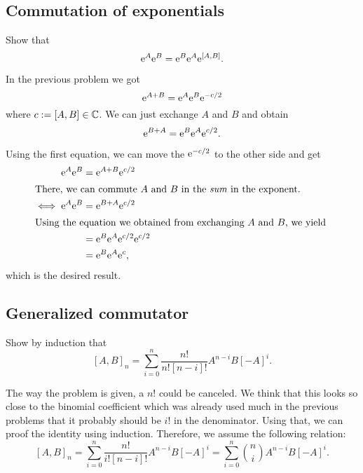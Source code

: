 \documentclass[11pt, english, fleqn, DIV=15, headinclude, BCOR=1.5cm]{scrartcl}
\begin{document}
\subsection{Commutation of exponentials}

\begin{problem}
    Show that
    \[
        \mathrm e^A \mathrm e^B = \mathrm e^B \mathrm e^A \mathrm e^{[A,B]}.
    \]
\end{problem}

In the previous problem we got
\[
    \mathrm e^{A + B} = \mathrm e^A \mathrm e^B \mathrm e^{-c/2}
\]
where $c := [A, B] \in \mathbb C$. We can just exchange $A$ and $B$ and obtain
\[
    \mathrm e^{B + A} = \mathrm e^B \mathrm e^A \mathrm e^{c/2}.
\]

Using the first equation, we can move the $\mathrm e^{-c/2}$ to the other side and
get
\begin{align*}
    \eup^A \eup^B &= \eup^{A + B} \eup^{c/2} \\
    \intertext{%
        There, we can commute $A$ and $B$ in the \emph{sum} in the exponent.
    }
    \iff \eup^A \eup^B &= \eup^{B + A} \eup^{c/2} \\
    \intertext{%
        Using the equation we obtained from exchanging $A$ and $B$, we yield
    }
    &= \eup^B \eup^A \eup^{c/2} \eup^{c/2} \\
    &= \eup^B \eup^A \eup^{c},
\end{align*}
which is the desired result.

\subsection{Generalized commutator}

\begin{problem}
    Show by induction that
    \[
        [A, B]_n = \sum_{i=0}^n \frac{n!}{n![n-i]!} A^{n-i} B [-A]^i.
    \]
\end{problem}

The way the problem is given, a $n!$ could be canceled. We think that this
looks so close to the binomial coefficient which was already used much in the
previous problems that it probably should be $i!$ in the denominator. Using
that, we can proof the identity using induction. Therefore, we assume the
following relation:
\[
    [A, B]_n
    = \sum_{i=0}^n \frac{n!}{i![n-i]!} A^{n-i} B [-A]^i
    = \sum_{i=0}^n \binom ni A^{n-i} B [-A]^i.
\]
\end{document}
